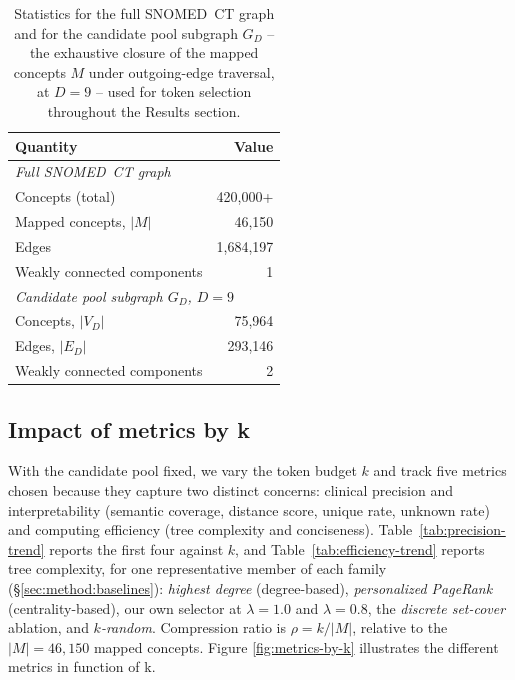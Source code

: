\begin{table}[h]
\centering
\small
\begin{tabular}{lr}
\toprule
\textbf{Quantity} & \textbf{Value} \\
\midrule
\multicolumn{2}{l}{\textit{Full SNOMED~CT graph}} \\
Concepts (total) & 420{,}000+ \\
Mapped concepts, $|M|$ & 46{,}150 \\
Edges & 1{,}684{,}197 \\
Weakly connected components & 1 \\
\midrule
\multicolumn{2}{l}{\textit{Candidate pool subgraph $G_D$, $D=9$}} \\
Concepts, $|V_D|$ & 75{,}964 \\
Edges, $|E_D|$ & 293{,}146 \\
Weakly connected components & 2 \\
\bottomrule
\end{tabular}
\caption{Statistics for the full SNOMED~CT graph and for the
candidate pool subgraph $G_D$ -- the exhaustive closure of the
mapped concepts $M$ under outgoing-edge traversal, at $D=9$ -- used
for token selection throughout the Results section.}
\label{tab:snomed-stats}
\end{table}

\subsection{Impact of metrics by k}
\label{sec:results:trend}

With the candidate pool fixed, we vary the token budget $k$ and track
five metrics chosen because they capture two distinct concerns: clinical
precision and interpretability (semantic coverage, distance score,
unique rate, unknown rate) and computing efficiency (tree complexity and conciseness).
Table~\ref{tab:precision-trend} reports the first four against $k$, and
Table~\ref{tab:efficiency-trend} reports tree complexity, for one
representative member of each family (\S\ref{sec:method:baselines}):
\emph{highest degree} (degree-based), \emph{personalized PageRank}
(centrality-based), our own selector at $\lambda=1.0$ and $\lambda=0.8$,
the \emph{discrete set-cover} ablation, and \emph{$k$-random}.
Compression ratio is $\rho = k/|M|$, relative to the $|M| = 46{,}150$
mapped concepts. Figure \ref{fig:metrics-by-k} illustrates the different metrics in function of k.

